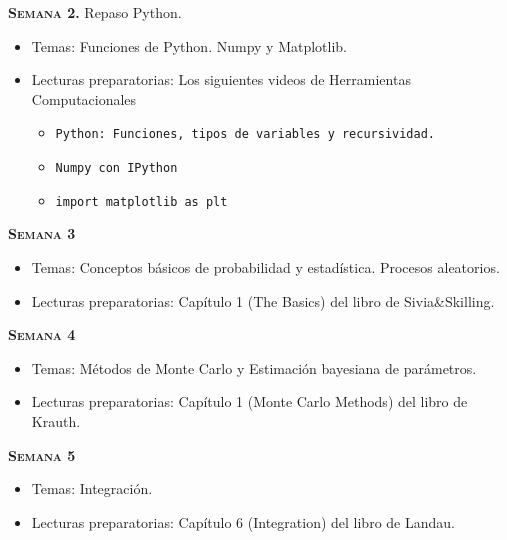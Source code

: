 \documentclass[letterpaper,10pt,onecolumn]{article}
\begin{document}
\noindent\textbf{\textsc{Semana 2.}} Repaso Python. \\[-0.5cm]
\begin{itemize}
\item Temas: 
Funciones de Python. Numpy y Matplotlib.\\[-0.6cm] 
\item Lecturas preparatorias: Los siguientes videos de Herramientas Computacionales

\begin{itemize}
\item \texttt{Python: Funciones, tipos de variables y recursividad.}
\item \texttt{Numpy con IPython}
\item \texttt{import matplotlib as plt}
\end{itemize}
\end{itemize}

\noindent\textbf{\textsc{Semana 3}}\\[-0.5cm]
\begin{itemize}
\item Temas: Conceptos b\'asicos de
  probabilidad y estad\'istica. Procesos aleatorios. \\[-0.6cm]  
\item Lecturas preparatorias: Cap\'itulo 1 (The Basics) del libro de
  Sivia\&Skilling. \\[-0.6cm]
\end{itemize}

\noindent\textbf{\textsc{Semana 4}}\\[-0.5cm]
\begin{itemize}
\item Temas: M\'etodos de Monte Carlo y Estimaci\'on bayesiana de par\'ametros. \\[-0.6cm]
\item Lecturas preparatorias: Cap\'itulo 1 (Monte Carlo Methods) del
  libro de Krauth.\\[-0.6cm]
\end{itemize}

\noindent\textbf{\textsc{Semana 5}}\\[-0.5cm]
\begin{itemize}
\item Temas: Integraci\'on. \\[-0.6cm]
\item Lecturas preparatorias: Cap\'itulo 6 (Integration) del libro de
Landau.\\[-0.6cm]
\end{itemize}
\end{document}

